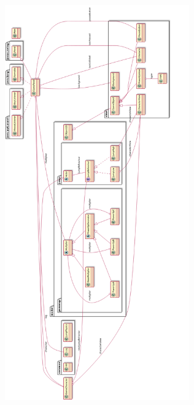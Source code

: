 \documentclass[a4paper]{article}
\begin{document}
\begin{center}
\includegraphics[width=300px]{org-img/Design_Explanation/2021-10-28_03-43-15_screenshot.png}
\end{center}
\end{document}
